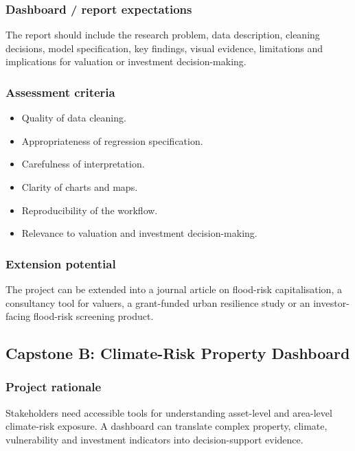 \documentclass[
  a4paper,
]{article}
\providecommand{\tightlist}{%
  \setlength{\itemsep}{0pt}\setlength{\parskip}{0pt}}
\begin{document}
\subsubsection{Dashboard / report
expectations}\label{dashboard-report-expectations}

The report should include the research problem, data description,
cleaning decisions, model specification, key findings, visual evidence,
limitations and implications for valuation or investment
decision-making.

\subsubsection{Assessment criteria}\label{assessment-criteria}

\begin{itemize}
\tightlist
\item
  Quality of data cleaning.
\item
  Appropriateness of regression specification.
\item
  Carefulness of interpretation.
\item
  Clarity of charts and maps.
\item
  Reproducibility of the workflow.
\item
  Relevance to valuation and investment decision-making.
\end{itemize}

\subsubsection{Extension potential}\label{extension-potential}

The project can be extended into a journal article on flood-risk
capitalisation, a consultancy tool for valuers, a grant-funded urban
resilience study or an investor-facing flood-risk screening product.

\subsection{Capstone B: Climate-Risk Property
Dashboard}\label{capstone-b-climate-risk-property-dashboard}

\subsubsection{Project rationale}\label{project-rationale-1}

Stakeholders need accessible tools for understanding asset-level and
area-level climate-risk exposure. A dashboard can translate complex
property, climate, vulnerability and investment indicators into
decision-support evidence.
\end{document}

